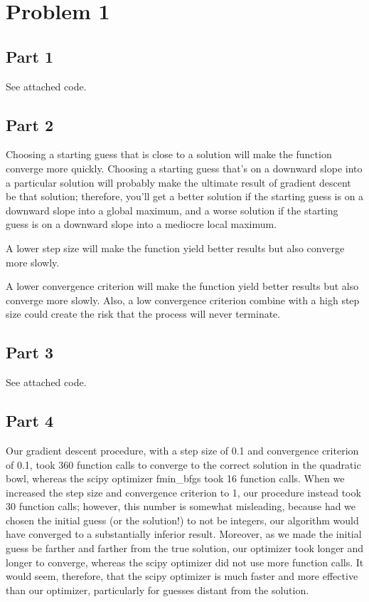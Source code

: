 \documentclass[12pt]{article}
\begin{document}
\section{Problem 1}

\subsection{Part 1}

See attached code.

\subsection{Part 2}

Choosing a starting guess that is close to a solution will make the function converge more quickly. Choosing a starting guess that's on a downward slope into a particular solution will probably make the ultimate result of gradient descent be that solution; therefore, you'll get a better solution if the starting guess is on a downward slope into a global maximum, and a worse solution if the starting guess is on a downward slope into a mediocre local maximum.

A lower step size will make the function yield better results but also converge more slowly.

A lower convergence criterion will make the function yield better results but also converge more slowly. Also, a low convergence criterion combine with a high step size could create the risk that the process will never terminate.

\subsection{Part 3}

See attached code.

\subsection{Part 4}

Our gradient descent procedure, with a step size of 0.1 and convergence criterion of 0.1, took 360 function calls to converge to the correct solution in the quadratic bowl, whereas the scipy optimizer fmin_bfgs took 16 function calls. When we increased the step size and convergence criterion to 1, our procedure instead took 30 function calls; however, this number is somewhat misleading, because had we chosen the initial guess (or the solution!) to not be integers, our algorithm would have converged to a substantially inferior result. Moreover, as we made the initial guess be farther and farther from the true solution, our optimizer took longer and longer to converge, whereas the scipy optimizer did not use more function calls. It would seem, therefore, that the scipy optimizer is much faster and more effective than our optimizer, particularly for guesses distant from the solution.
\end{document}
